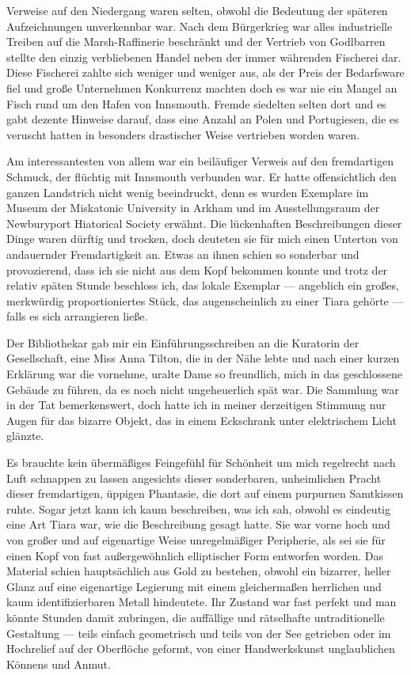 Verweise auf den Niedergang waren selten, obwohl die Bedeutung der späteren Aufzeichnungen unverkennbar war. Nach dem Bürgerkrieg war alles industrielle Treiben auf die Marsh-Raffinerie beschränkt und der Vertrieb von Godlbarren stellte den einzig verbliebenen Handel neben der immer währenden Fischerei dar. Diese Fischerei zahlte sich weniger und weniger aus, als der Preis der Bedarfsware fiel und große Unternehmen Konkurrenz machten doch es war nie ein Mangel an Fisch rund um den Hafen von Innsmouth. Fremde siedelten selten dort und es gabt dezente Hinweise darauf, dass eine Anzahl an Polen und Portugiesen, die es veruscht hatten in besonders drastischer Weise vertrieben worden waren.

Am interessantesten von allem war ein beiläufiger Verweis auf den fremdartigen Schmuck,  der flüchtig mit Innsmouth verbunden war. Er hatte offensichtlich den ganzen Landstrich nicht wenig beeindruckt,  denn es wurden Exemplare im Museum der Miskatonic University in Arkham und im Ausstellungsraum der Newburyport Hiatorical Society erwähnt. Die lückenhaften Beschreibungen dieser Dinge waren dürftig und trocken,  doch deuteten sie für mich einen Unterton von andauernder Fremdartigkeit an. Etwas an ihnen schien so sonderbar und provozierend, dass ich sie nicht aus dem Kopf bekommen konnte und trotz der relativ späten Stunde beschloss ich, das lokale Exemplar --- angeblich ein großes, merkwürdig proportioniertes Stück, das augenscheinlich zu einer Tiara gehörte --- falls es sich arrangieren ließe.

Der Bibliothekar gab mir ein Einführungsschreiben an die Kuratorin der Gesellschaft, eine Miss Anna Tilton, die in der Nähe lebte und nach einer kurzen Erklärung war die vornehme, uralte Dame so freundlich, mich in das geschlossene Gebäude zu führen, da es noch nicht ungeheuerlich spät war. Die Sammlung war in der Tat bemerkenswert, doch hatte ich in meiner derzeitigen Stimmung nur Augen für das bizarre Objekt, das in einem Eckschrank unter elektrischem Licht glänzte.

Es brauchte kein übermäßiges Feingefühl für Schönheit um mich regelrecht nach Luft schnappen zu lassen angesichts dieser sonderbaren, unheimlichen Pracht dieser fremdartigen, üppigen Phantasie, die dort auf einem purpurnen Samtkissen ruhte. Sogar jetzt kann ich kaum beschreiben, was ich sah, obwohl es eindeutig eine Art Tiara war, wie die Beschreibung gesagt hatte. Sie war vorne hoch und von großer und auf eigenartige Weise unregelmäßiger Peripherie, als sei sie für einen Kopf von fast außergewöhnlich elliptischer Form entworfen worden. Das Material schien hauptsächlich aus Gold zu bestehen, obwohl ein bizarrer, heller Glanz auf eine eigenartige Legierung mit einem gleichermaßen herrlichen und kaum identifizierbaren Metall hindeutete. Ihr Zustand war fast perfekt und man könnte Stunden damit zubringen, die auffällige und rätselhafte untraditionelle Gestaltung --- teils einfach geometrisch und teils von der See getrieben oder im Hochrelief auf der Oberflöche geformt, von einer Handwerkskunst unglaublichen Könnens und Anmut.

